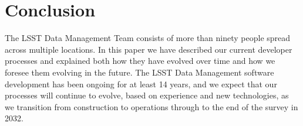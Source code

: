 \section{Conclusion}

The LSST Data Management Team consists of more than ninety people spread across multiple locations.
In this paper we have described our current developer processes and explained both how they have evolved over time and how we foresee them evolving in the future.
The LSST Data Management software development has been ongoing for at least 14 years, and we expect that our processes will continue to evolve, based on experience and new technologies, as we transition from construction to operations through to the end of the survey in 2032.
